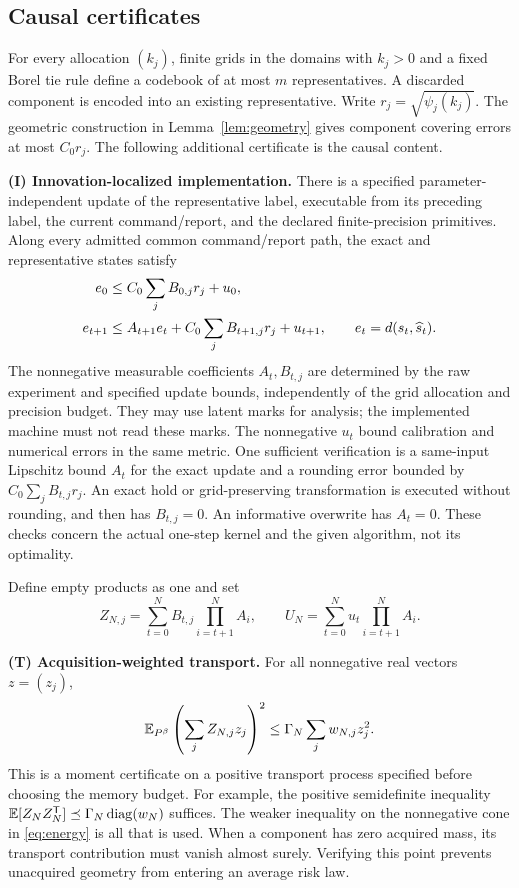 \subsection{Causal certificates}
For every allocation $(k_j)$, finite grids in the domains with $k_j>0$ and a fixed Borel tie rule define a codebook of at most $m$ representatives. A discarded component is encoded into an existing representative. Write $r_j=\sqrt{\psi_j(k_j)}$. The geometric construction in Lemma~\ref{lem:geometry} gives component covering errors at most $C_0r_j$. The following additional certificate is the causal content.

\smallskip\noindent\textbf{(I) Innovation-localized implementation.}
There is a specified parameter-independent update of the representative label, executable from its preceding label, the current command/report, and the declared finite-precision primitives. Along every admitted common command/report path, the exact and representative states satisfy
\begin{align}
 e_0&\le C_0\sum_j B_{0,j}r_j+u_0,\notag\\
 e_{t+1}&\le A_{t+1}e_t+C_0\sum_j B_{t+1,j}r_j+u_{t+1},
 \qquad e_t=d(s_t,\widehat s_t).\label{eq:innovation}
\end{align}
The nonnegative measurable coefficients $A_t,B_{t,j}$ are determined by the raw experiment and specified update bounds, independently of the grid allocation and precision budget. They may use latent marks for analysis; the implemented machine must not read these marks. The nonnegative $u_t$ bound calibration and numerical errors in the same metric. One sufficient verification is a same-input Lipschitz bound $A_t$ for the exact update and a rounding error bounded by $C_0\sum_jB_{t,j}r_j$. An exact hold or grid-preserving transformation is executed without rounding, and then has $B_{t,j}=0$. An informative overwrite has $A_t=0$. These checks concern the actual one-step kernel and the given algorithm, not its optimality.

Define empty products as one and set
\begin{equation}\label{eq:transport}
 Z_{N,j}=\sum_{t=0}^N B_{t,j}\prod_{i=t+1}^N A_i,
 \qquad U_N=\sum_{t=0}^N u_t\prod_{i=t+1}^N A_i.
\end{equation}

\smallskip\noindent\textbf{(T) Acquisition-weighted transport.}
For all nonnegative real vectors $z=(z_j)$,
\begin{equation}\label{eq:energy}
 \mathbb E_{P^\beta}\left(\sum_j Z_{N,j}z_j\right)^2
 \le \Gamma_N\sum_j w_{N,j}z_j^2.
\end{equation}
This is a moment certificate on a positive transport process specified before choosing the memory budget. For example, the positive semidefinite inequality $\mathbb E[Z_NZ_N^{\mathsf T}]\preceq\Gamma_N\operatorname{diag}(w_N)$ suffices. The weaker inequality on the nonnegative cone in \eqref{eq:energy} is all that is used. When a component has zero acquired mass, its transport contribution must vanish almost surely. Verifying this point prevents unacquired geometry from entering an average risk law.

